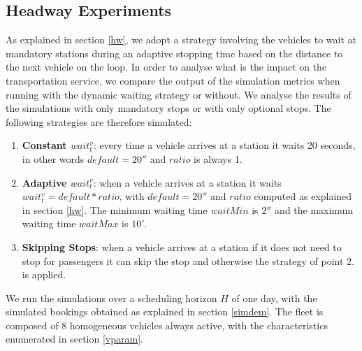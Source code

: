 \documentclass[12pt,a4paper]{article}
\begin{document}
\subsection{Headway Experiments}
As explained in section \ref{hw}, we adopt a strategy involving the vehicles to wait at mandatory stations during an adaptive stopping time based on the distance to the next vehicle on the loop. In order to analyse what is the impact on the transportation service, we compare the output of the simulation metrics when running with the dynamic waiting strategy or without. We analyse the results of the simulations with only mandatory stops or with only optional stops. The following strategies are therefore simulated:
\begin{enumerate}
\setlength\itemsep{1pt}
\item \textbf{Constant $wait_t^{v}$}: every time a vehicle arrives at a station it waits 20 seconds, in other words $default= 20''$ and $ratio$ is always 1. 
\item \textbf{Adaptive $wait_t^{v}$}: when a vehicle arrives at a station it waits $wait_t^{v} = default * ratio$, with $default = 20''$ and $ratio$ computed as explained in section \ref{hw}. The minimum waiting time $waitMin$ is $2''$ and the maximum waiting time $waitMax$ is $10'$.
\item \textbf{Skipping Stops}: when a vehicle arrives at a station if it does not need to stop for passengers it can skip the stop and otherwise the strategy of point 2. is applied.
\end{enumerate}
We run the simulations over a scheduling horizon $H$ of one day, with the simulated bookings obtained as explained in section \ref{simdem}. The fleet is composed of 8 homogeneous vehicles always active, with the characteristics enumerated in section \ref{vparam}. 
\end{document}
